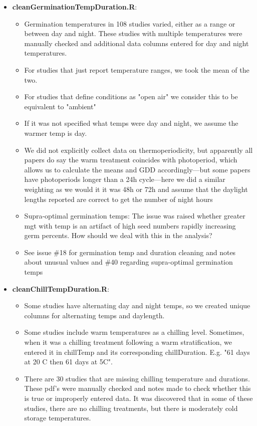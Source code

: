 \documentclass{article}[12pt]
\begin{document}
\begin{enumerate}
\begin{itemize}
\item \textbf{cleanGerminationTempDuration.R}: 
\begin{itemize} 
\item Germination temperatures in 108 studies varied, either as a range or between day and night. These studies with multiple temperatures were manually checked and additional data columns entered for day and night temperatures. 
\item For studies that just report temperature ranges, we took the mean of the two. 
\item For studies that define conditions as "open air" we consider this to be equivalent to "ambient"
\item If it was not specified what temps were day and night, we assume the warmer temp is day. 
\item We did not explicitly collect data on thermoperiodicity, but apparently all papers do say the warm treatment coincides with photoperiod, which allows us to calculate the means and GDD accordingly---but some papers have photoperiods longer than a 24h cycle---here we did a similar weighting as we would it it was 48h or 72h and assume that the daylight lengths reported are correct to get the number of night hours 
\item Supra-optimal germination temps: The issue was raised whether greater mgt with temp is an artifact of high seed numbers rapidly increasing germ percents. How should we deal with this in the analysis?
\item See issue \#18 for germination temp and duration cleaning and notes about unusual values and \#40 regarding supra-optimal germination temps
\end{itemize}
\item \textbf{cleanChillTempDuration.R}: 
\begin{itemize}
\item Some studies have alternating day and night temps, so we created unique columns for alternating temps and daylength. %
\item Some studies include warm temperatures as a chilling level. Sometimes, when it was a chilling treatment following a warm stratification, we entered it in chillTemp and its corresponding chillDuration. E.g.  "61 days at 20 C then 61 days at 5C". 
\item There are 30 studies that are missing chilling temperature and durations. These pdf's were manually checked and notes made to check whether this is true or improperly entered data. It was discovered that in some of these studies, there are no chilling treatments, but there is moderately cold storage temperatures. 

\end{itemize}
\end{itemize}
\end{enumerate}
\end{document}
